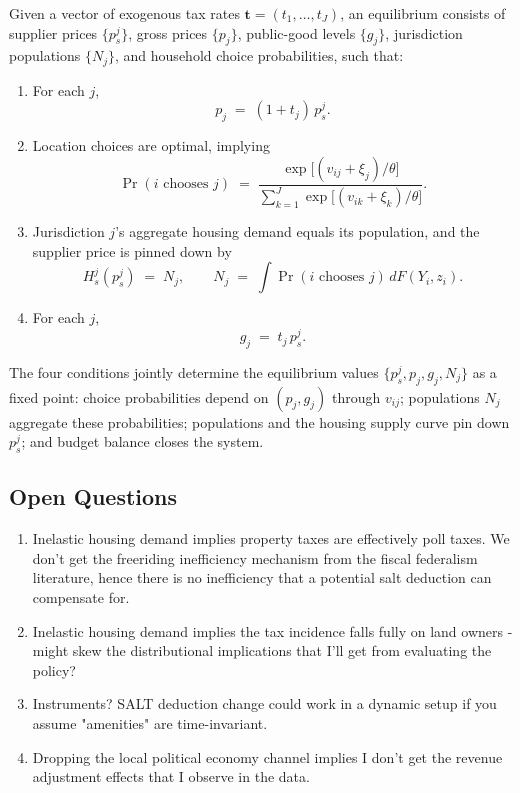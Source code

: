 \documentclass[fleqn,10pt]{olplainarticle}
\begin{document}
Given a vector of exogenous tax rates $\mathbf{t} = (t_1, \ldots, t_J)$, an equilibrium consists of supplier prices $\{p_s^j\}$, gross prices $\{p_j\}$, public-good levels $\{g_j\}$, jurisdiction populations $\{N_j\}$, and household choice probabilities, such that:
\begin{enumerate}
    \item For each $j$, $$p_j \;=\; (1 + t_j)\, p_s^j.$$
    \item Location choices are optimal, implying $$\Pr(\text{$i$ chooses $j$}) \;=\; \frac{\exp\!\big[(v_{ij} + \xi_j)/\theta\big]}{\sum_{k=1}^{J} \exp\!\big[(v_{ik} + \xi_k)/\theta\big]}.$$
    \item  Jurisdiction $j$'s aggregate housing demand equals its population, and the supplier price is pinned down by $$H_s^j(p_s^j) \;=\; N_j, \qquad N_j \;=\; \int \Pr(\text{$i$ chooses $j$}) \, dF(Y_i, z_i).$$
    \item For each $j$, $$g_j \;=\; t_j \, p_s^j.$$
\end{enumerate}
 
The four conditions jointly determine the equilibrium values $\{p_s^j, p_j, g_j, N_j\}$ as a fixed point: choice probabilities depend on $(p_j, g_j)$ through $v_{ij}$; populations $N_j$ aggregate these probabilities; populations and the housing supply curve pin down $p_s^j$; and budget balance closes the system.
 
\subsection*{Open Questions}
\begin{enumerate}
    \item Inelastic housing demand implies property taxes are effectively poll taxes. We don't get the freeriding inefficiency mechanism from the fiscal federalism literature, hence there is no inefficiency that a potential salt deduction can compensate for.
    \item Inelastic housing demand implies the tax incidence falls fully on land owners - might skew the distributional implications that I'll get from evaluating the policy?
    \item Instruments? SALT deduction change could work in a dynamic setup if you assume "amenities" are time-invariant.
    \item Dropping the local political economy channel implies I don't get the revenue adjustment effects that I observe in the data.
\end{enumerate}
 
\end{document}
